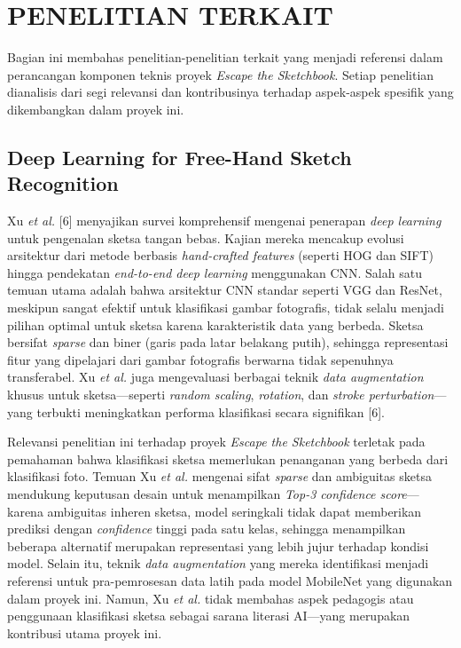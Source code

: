 \section{PENELITIAN TERKAIT}
\label{sec:penelitian-terkait}

Bagian ini membahas penelitian-penelitian terkait yang menjadi referensi dalam perancangan komponen teknis proyek \textit{Escape the Sketchbook}. Setiap penelitian dianalisis dari segi relevansi dan kontribusinya terhadap aspek-aspek spesifik yang dikembangkan dalam proyek ini.

\subsection{Deep Learning for Free-Hand Sketch Recognition}
\label{subsec:penelitian-sketch}

Xu \textit{et al.} [6] menyajikan survei komprehensif mengenai penerapan \textit{deep learning} untuk pengenalan sketsa tangan bebas. Kajian mereka mencakup evolusi arsitektur dari metode berbasis \textit{hand-crafted features} (seperti HOG dan SIFT) hingga pendekatan \textit{end-to-end deep learning} menggunakan CNN. Salah satu temuan utama adalah bahwa arsitektur CNN standar seperti VGG dan ResNet, meskipun sangat efektif untuk klasifikasi gambar fotografis, tidak selalu menjadi pilihan optimal untuk sketsa karena karakteristik data yang berbeda. Sketsa bersifat \textit{sparse} dan biner (garis pada latar belakang putih), sehingga representasi fitur yang dipelajari dari gambar fotografis berwarna tidak sepenuhnya transferabel. Xu \textit{et al.} juga mengevaluasi berbagai teknik \textit{data augmentation} khusus untuk sketsa—seperti \textit{random scaling}, \textit{rotation}, dan \textit{stroke perturbation}—yang terbukti meningkatkan performa klasifikasi secara signifikan [6].

Relevansi penelitian ini terhadap proyek \textit{Escape the Sketchbook} terletak pada pemahaman bahwa klasifikasi sketsa memerlukan penanganan yang berbeda dari klasifikasi foto. Temuan Xu \textit{et al.} mengenai sifat \textit{sparse} dan ambiguitas sketsa mendukung keputusan desain untuk menampilkan \textit{Top-3 confidence score}—karena ambiguitas inheren sketsa, model seringkali tidak dapat memberikan prediksi dengan \textit{confidence} tinggi pada satu kelas, sehingga menampilkan beberapa alternatif merupakan representasi yang lebih jujur terhadap kondisi model. Selain itu, teknik \textit{data augmentation} yang mereka identifikasi menjadi referensi untuk pra-pemrosesan data latih pada model MobileNet yang digunakan dalam proyek ini. Namun, Xu \textit{et al.} tidak membahas aspek pedagogis atau penggunaan klasifikasi sketsa sebagai sarana literasi AI—yang merupakan kontribusi utama proyek ini.

